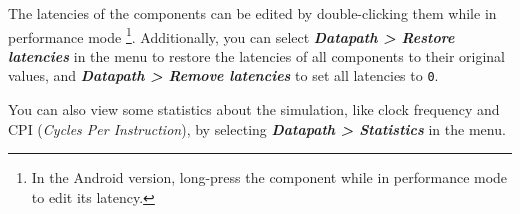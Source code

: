 \documentclass[11pt,a4paper,twoside,titlepage]{report}
\newcommand{\menupath}[1]{\textbf{\emph{#1}}}
\begin{document}
The latencies of the components can be edited by double-clicking them while
in performance mode \footnote{In the Android version, long-press the 
component while in performance mode to edit its latency.}.
Additionally, you can select \menupath{Datapath > Restore latencies} in the
menu to restore the latencies of all components to their original values,
and \menupath{Datapath > Remove latencies} to set all latencies to \verb+0+.

You can also view some statistics about the simulation, like clock frequency
and CPI (\emph{Cycles Per Instruction}), by selecting 
\menupath{Datapath > Statistics} in the menu.
\end{document}
